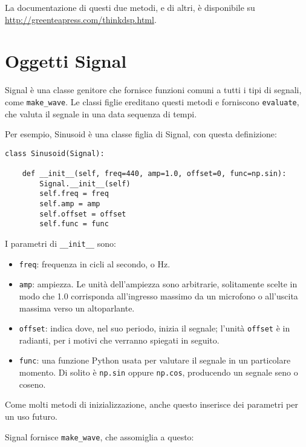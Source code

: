 \documentclass[12pt,a4paper]{book}
\begin{document}
La documentazione di questi due metodi, e di altri, è disponibile su \url{http://greenteapress.com/thinkdsp.html}.

\section{Oggetti Signal} \label{sigobs} 

Signal è una classe genitore che fornisce funzioni comuni a tutti i tipi di segnali, come \verb"make_wave". Le classi figlie ereditano questi metodi e forniscono {\tt evaluate}, che valuta il segnale in una data sequenza di tempi.

Per esempio, Sinusoid è una classe figlia di Signal, con questa definizione:

\begin{verbatim} 
class Sinusoid(Signal):

    def __init__(self, freq=440, amp=1.0, offset=0, func=np.sin):
        Signal.__init__(self)
        self.freq = freq
        self.amp = amp
        self.offset = offset
        self.func = func
 \end{verbatim} 

I parametri di \verb"__init__" sono:

\begin{itemize} 

\item {\tt freq}: frequenza in cicli al secondo, o Hz.

\item {\tt amp}: ampiezza. Le unità dell'ampiezza sono arbitrarie, solitamente scelte in modo che 1.0 corrisponda all'ingresso massimo da un microfono o all'uscita massima verso un altoparlante.

\item {\tt offset}: indica dove, nel suo periodo, inizia il segnale; l'unità {\tt offset} è in radianti, per i motivi che verranno spiegati in seguito.

\item {\tt func}: una funzione Python usata per valutare il segnale in un particolare momento. Di solito è {\tt np.sin} oppure {\tt np.cos}, producendo un segnale seno o coseno.

\end{itemize} 

Come molti metodi di inizializzazione, anche questo inserisce dei parametri per un uso futuro.

Signal fornisce \verb"make_wave", che assomiglia a questo:
\end{document}
